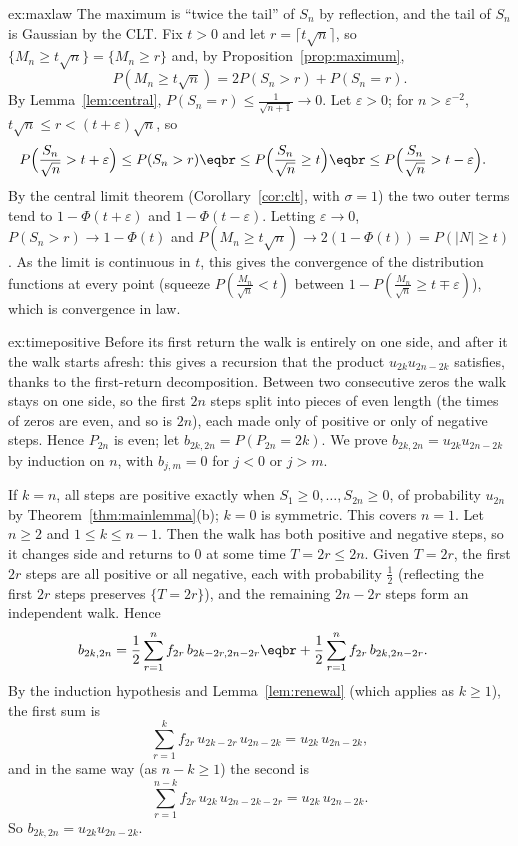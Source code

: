 \begin{solution}{ex:maxlaw}
\idea The maximum is ``twice the tail'' of $S_n$ by reflection, and the tail of $S_n$ is Gaussian by the CLT.
\writeup Fix $t>0$ and let $r=\lceil t\sqrt n\rceil$, so $\{M_n\ge t\sqrt n\}=\{M_n\ge r\}$ and, by Proposition~\ref{prop:maximum},
\[
P(M_n\ge t\sqrt n)=2P(S_n>r)+P(S_n=r).
\]
By Lemma~\ref{lem:central}, $P(S_n=r)\le\frac1{\sqrt{n+1}}\to0$. Let $\varepsilon>0$; for $n>\varepsilon^{-2}$, $t\sqrt n\le r<(t+\varepsilon)\sqrt n$, so
\[
\begin{aligned}P\Bigl(\frac{S_n}{\sqrt n}>t+\varepsilon\Bigr)&\le P(S_n>r)\eqbr\le P\Bigl(\frac{S_n}{\sqrt n}\ge t\Bigr)\eqbr\le P\Bigl(\frac{S_n}{\sqrt n}>t-\varepsilon\Bigr).\end{aligned}
\]
By the central limit theorem (Corollary~\ref{cor:clt}, with $\sigma=1$) the two outer terms tend to $1-\Phi(t+\varepsilon)$ and $1-\Phi(t-\varepsilon)$. Letting $\varepsilon\to0$,
$P(S_n>r)\to1-\Phi(t)$ and $P(M_n\ge t\sqrt n)\to2(1-\Phi(t))=P(|N|\ge t)$. As the limit is continuous in $t$, this gives the convergence of the
distribution functions at every point (squeeze $P(\frac{M_n}{\sqrt n}<t)$ between $1-P(\frac{M_n}{\sqrt n}\ge t\mp\varepsilon)$), which is convergence in law.
\end{solution}

\begin{solution}{ex:timepositive}
\idea Before its first return the walk is entirely on one side, and after it the walk starts afresh: this gives a
recursion that the product $u_{2k}u_{2n-2k}$ satisfies, thanks to the first-return decomposition.
\writeup Between two consecutive zeros the walk stays on one side, so the first $2n$ steps split into pieces of even length (the
times of zeros are even, and so is $2n$), each made only of positive or only of negative steps. Hence $P_{2n}$ is even; let
$b_{2k,2n}=P(P_{2n}=2k)$. We prove $b_{2k,2n}=u_{2k}u_{2n-2k}$ by induction on $n$, with $b_{j,m}=0$ for $j<0$ or $j>m$.

If $k=n$, all steps are positive exactly when $S_1\ge0,\dots,S_{2n}\ge0$, of probability $u_{2n}$ by Theorem~\ref{thm:mainlemma}(b); $k=0$ is symmetric.
This covers $n=1$. Let $n\ge2$ and $1\le k\le n-1$. Then the walk has both positive and negative steps, so it changes side and
returns to $0$ at some time $T=2r\le2n$. Given $T=2r$, the first $2r$ steps are all positive or all negative, each with probability
$\frac12$ (reflecting the first $2r$ steps preserves $\{T=2r\}$), and the remaining $2n-2r$ steps form an independent walk. Hence
\[
\begin{aligned}b_{2k,2n}&=\frac12\sum_{r=1}^nf_{2r}\,b_{2k-2r,2n-2r}\eqbr+\frac12\sum_{r=1}^nf_{2r}\,b_{2k,2n-2r}.\end{aligned}
\]
By the induction hypothesis and Lemma~\ref{lem:renewal} (which applies as $k\ge1$), the first sum is
\[
\sum_{r=1}^kf_{2r}\,u_{2k-2r}\,u_{2n-2k}=u_{2k}\,u_{2n-2k},
\]
and in the same way (as $n-k\ge1$) the second is
\[
\sum_{r=1}^{n-k}f_{2r}\,u_{2k}\,u_{2n-2k-2r}=u_{2k}\,u_{2n-2k}.
\] So $b_{2k,2n}=u_{2k}u_{2n-2k}$.
\end{solution}

